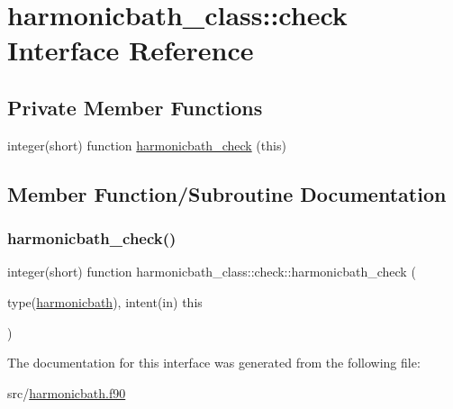 \hypertarget{interfaceharmonicbath__class_1_1check}{}\section{harmonicbath\+\_\+class\+:\+:check Interface Reference}
\label{interfaceharmonicbath__class_1_1check}
\subsection*{Private Member Functions}
\begin{DoxyCompactItemize}
\item 
integer(short) function \hyperlink{interfaceharmonicbath__class_1_1check_aad3d94e95a03caa54e1ba8541130b2df}{harmonicbath\+\_\+check} (this)
\end{DoxyCompactItemize}


\subsection{Member Function/\+Subroutine Documentation}
\mbox{\label{interfaceharmonicbath__class_1_1check_aad3d94e95a03caa54e1ba8541130b2df}} 
\subsubsection{\texorpdfstring{harmonicbath\+\_\+check()}{harmonicbath\_check()}}
{\footnotesize\ttfamily integer(short) function harmonicbath\+\_\+class\+::check\+::harmonicbath\+\_\+check (\begin{DoxyParamCaption}\item[{type(\hyperlink{structharmonicbath__class_1_1harmonicbath}{harmonicbath}), intent(in)}]{this }\end{DoxyParamCaption})\hspace{0.3cm}{\ttfamily [private]}}



The documentation for this interface was generated from the following file\+:\begin{DoxyCompactItemize}
\item 
src/\hyperlink{harmonicbath_8f90}{harmonicbath.\+f90}\end{DoxyCompactItemize}

